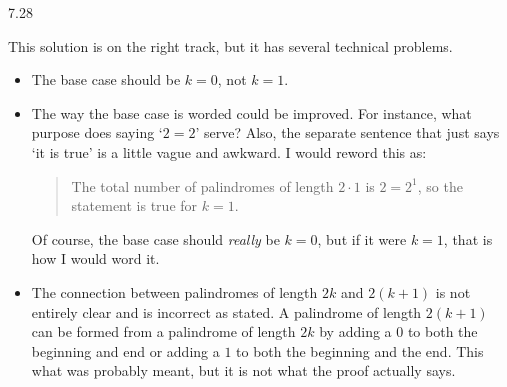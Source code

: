 \begin{Answer}{7.28}
\begin{pfevalenum}
\item
This solution is on the right track,  but it has several technical problems.
	\begin{itemize}
	\item
	The base case should
	be $k=0$, not $k=1$.
	\item
	The way the base case is worded could be improved.  For instance,
	what purpose does saying `$2=2$' serve?  Also, the separate sentence that just says `it is true' is
	a little vague and awkward.  I would reword this as:
		\begin{quote}
		The total number of palindromes of length $2\cdot 1$ is $2=2^1$, so the statement is true for $k=1$.
		\end{quote}
	Of course, the base case should {\em really} be $k=0$, but if it were $k=1$, that is how I would word it.
	\item
	The connection between palindromes of length $2k$ and $2(k+1)$ is not entirely clear and is incorrect
	as stated.  A palindrome of length $2(k+1)$ can be formed from a palindrome of length $2k$ by adding
	a $0$ to both the beginning and end or adding a $1$ to both the beginning and the end.
	This what was probably meant, but it is not what the proof actually says.
	

\end{itemize}
\end{pfevalenum}
\end{Answer}
